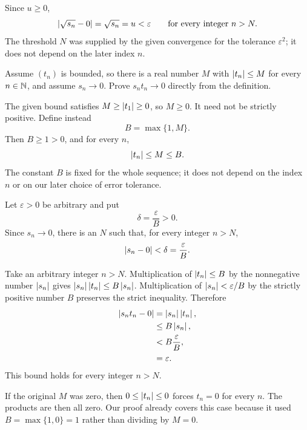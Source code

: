 Since $u\ge0$,
\[
 \left|\sqrt{s_n}-0\right|=\sqrt{s_n}=u<\varepsilon
 \qquad\text{for every integer }n>N.
\]
The threshold $N$ was supplied by the given convergence for the
tolerance $\varepsilon^2$; it does not depend on the later index $n$.



\goal Assume $(t_n)$ is bounded, so there is a real number $M$ with
$\left|t_n\right|\le M$ for every $n\in\mathbb{N}$, and assume $s_n\to0$.
Prove $s_nt_n\to0$ directly from the definition.

The given bound satisfies $M\ge\left|t_1\right|\ge0$, so $M\ge0$.
It need not be strictly positive. Define instead
\[
 B=\max\{1,M\}.
\]
Then $B\ge1>0$, and for every $n$,
\[
 \left|t_n\right|\le M\le B.
\]
The constant $B$ is fixed for the whole sequence; it does not depend
on the index $n$ or on our later choice of error tolerance.

Let $\varepsilon>0$ be arbitrary and put
\[
 \delta=\frac{\varepsilon}{B}>0.
\]
Since $s_n\to0$, there is an $N$ such that, for every integer $n>N$,
\[
 \left|s_n-0\right|<\delta=\frac{\varepsilon}{B}.
\]

Take an arbitrary integer $n>N$. Multiplication of
$\left|t_n\right|\le B$ by the nonnegative number $\left|s_n\right|$ gives
$\left|s_n\right|\left|t_n\right|\le B\left|s_n\right|$.
Multiplication of $\left|s_n\right|<\varepsilon/B$ by the strictly positive
number $B$ preserves the strict inequality. Therefore
\begin{align*}
 \left|s_nt_n-0\right|
   &=\left|s_n\right|\left|t_n\right|,\\
   &\le B\left|s_n\right|,\\
   &<B\frac{\varepsilon}{B},\\
   &=\varepsilon.
\end{align*}
This bound holds for every integer $n>N$.

If the original $M$ was zero, then $0\le\left|t_n\right|\le0$ forces
$t_n=0$ for every $n$. The products are then all zero. Our proof
already covers this case because it used $B=\max\{1,0\}=1$ rather
than dividing by $M=0$.

